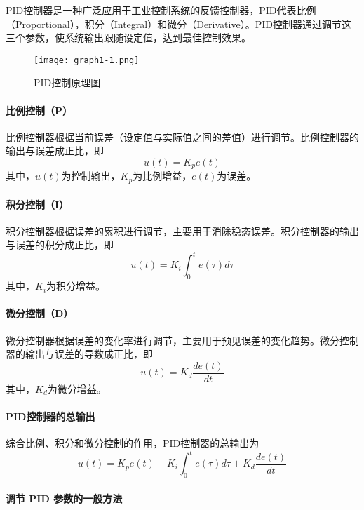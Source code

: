 \documentclass[dvipsnames, svgnames,a4paper,11pt]{article}
\begin{document}
        PID控制器是一种广泛应用于工业控制系统的反馈控制器，PID代表比例（Proportional），积分（Integral）和微分（Derivative）。PID控制器通过调节这三个参数，使系统输出跟随设定值，达到最佳控制效果。

        \begin{figure}[htbp]
            \centering
            \texttt{[image: graph1-1.png]}
            \caption{PID控制原理图}
            \label{fig:fig1-1}
        \end{figure}

        \paragraph{比例控制（P）}

            比例控制器根据当前误差（设定值与实际值之间的差值）进行调节。比例控制器的输出与误差成正比，即
            \[ u(t) = K_p e(t) \]
            其中，$u(t)$为控制输出，$K_p$为比例增益，$e(t)$为误差。

        \paragraph{积分控制（I）}

        积分控制器根据误差的累积进行调节，主要用于消除稳态误差。积分控制器的输出与误差的积分成正比，即
        \[ u(t) = K_i \int_0^t e(\tau) d\tau \]
        其中，$K_i$为积分增益。

        \paragraph{微分控制（D）}

        微分控制器根据误差的变化率进行调节，主要用于预见误差的变化趋势。微分控制器的输出与误差的导数成正比，即
        \[ u(t) = K_d \frac{de(t)}{dt} \]
        其中，$K_d$为微分增益。

        \paragraph{PID控制器的总输出}

        综合比例、积分和微分控制的作用，PID控制器的总输出为
        \[ u(t) = K_p e(t) + K_i \int_0^t e(\tau) d\tau + K_d \frac{de(t)}{dt} \]


        \paragraph*{调节 PID 参数的一般方法}
\end{document}
